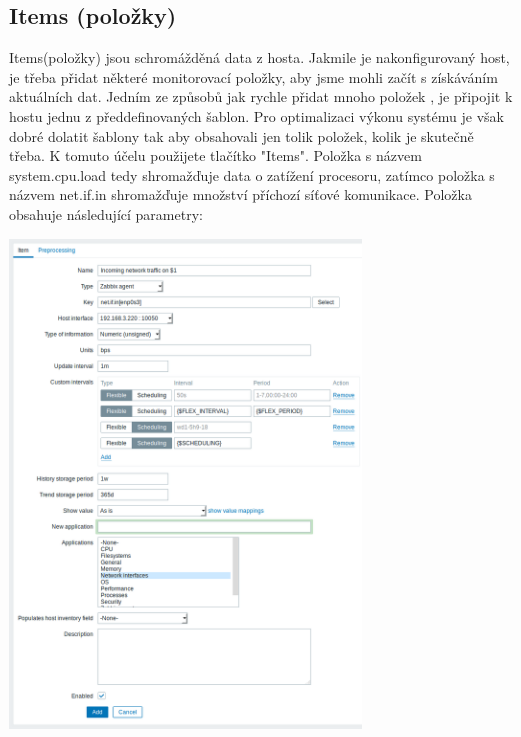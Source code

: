 \documentclass{article}
\begin{document}
  \subsection{Items (položky)}
   Items(položky) jsou schromážděná data z hosta. Jakmile je nakonfigurovaný host, je třeba přidat některé monitorovací položky, aby jsme mohli začít s získáváním aktuálních dat.
   \newline
   Jedním ze způsobů jak rychle přidat mnoho položek , je připojit k hostu jednu z předdefinovaných šablon. Pro optimalizaci výkonu systému je však dobré dolatit šablony tak aby obsahovali jen tolik položek, kolik je skutečně třeba. \newline
   K tomuto účelu použijete tlačítko "Items". Položka s názvem system.cpu.load tedy shromažďuje data o zatížení procesoru, zatímco položka s názvem net.if.in shromažďuje množství příchozí síťové komunikace.
   \newline
   Položka obsahuje následující parametry:
   \begin{center}
        \includegraphics[width=0.7\textwidth]{obrazky/item.png}
   \end{center}
  
\end{document}
